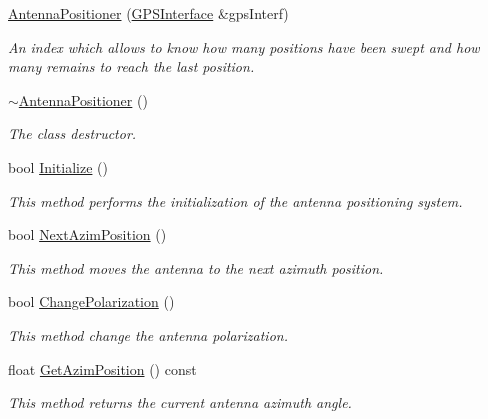 \begin{DoxyCompactItemize}
\item 
\hyperlink{classAntennaPositioner_ad7e864f6073421c98585c64802a3e78e}{Antenna\+Positioner} (\hyperlink{classGPSInterface}{G\+P\+S\+Interface} \&gps\+Interf)
\begin{DoxyCompactList}\small\item\em An index which allows to know how many positions have been swept and how many remains to reach the last position. \end{DoxyCompactList}\item 
\hyperlink{classAntennaPositioner_a7a3a48b1aab43b9a43b664567a8c5829}{$\sim$\+Antenna\+Positioner} ()
\begin{DoxyCompactList}\small\item\em The class destructor. \end{DoxyCompactList}\item 
bool \hyperlink{classAntennaPositioner_a5087caa452709b33082c41b2cef2a23e}{Initialize} ()
\begin{DoxyCompactList}\small\item\em This method performs the initialization of the antenna positioning system. \end{DoxyCompactList}\item 
bool \hyperlink{classAntennaPositioner_a2e05c385b9933d2ee1d4f8f953c99070}{Next\+Azim\+Position} ()
\begin{DoxyCompactList}\small\item\em This method moves the antenna to the next azimuth position. \end{DoxyCompactList}\item 
bool \hyperlink{classAntennaPositioner_a0e4f58f67280f2a6daa10c7cc02f0abd}{Change\+Polarization} ()
\begin{DoxyCompactList}\small\item\em This method change the antenna polarization. \end{DoxyCompactList}\item 
\mbox{\label{classAntennaPositioner_a72cb61d647eaad277f256b3ca9555f8a}} 
float \hyperlink{classAntennaPositioner_a72cb61d647eaad277f256b3ca9555f8a}{Get\+Azim\+Position} () const
\begin{DoxyCompactList}\small\item\em This method returns the current antenna azimuth angle. \end{DoxyCompactList}\item 

\end{DoxyCompactItemize}

